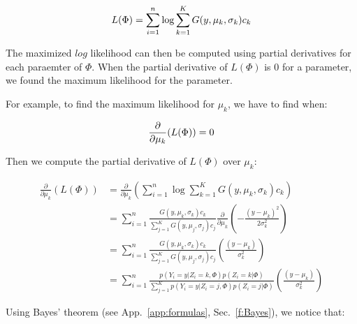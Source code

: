   \begin{equation*}\label{LP}
  L(\Phi)=\sum_{i=1}^n \operatorname*{log} \sum_{k=1}^K G(y,\mu_k,\sigma_k)c_k\\
  \end{equation*}

The maximized $log$ likelihood can then be computed using partial derivatives for each paraemter of $\Phi$. When the partial derivative of $L(\Phi)$ is $0$ for a parameter, we found the maximum likelihood for the parameter.
\par
For example, to find the maximum likelihood for $\mu_k$, we have to find when:

  \begin{equation*}\label{PD}
  \frac{\partial}{\partial\mu_k}(L(\Phi))=0\\
  \end{equation*}

\par
Then we compute the partial derivative of $L(\Phi)$ over $\mu_k$:

  \begin{align}\label{partialDerivative}
  \frac{\partial}{\partial\mu_k}(L(\Phi)) &= \frac{\partial}{\partial\mu_k}( \sum_{i=1}^n \operatorname*{log} \sum_{k=1}^K G(y,\mu_k,\sigma_k)c_k\nonumber)  \\
                                          &= \sum_{i=1}^n \frac{G(y,\mu_k,\sigma_k)c_k}{\sum_{j=1}^K G(y,\mu_j,\sigma_j)c_j}\frac{\partial}{\partial\mu_k}  (-\frac{(y-\mu_k)^2}{2\sigma_k^2}) \nonumber \\
                                          &= \sum_{i=1}^n \frac{G(y,\mu_k,\sigma_k)c_k}{\sum_{j=1}^K G(y,\mu_j,\sigma_j)c_j}(\frac{(y-\mu_k)}{\sigma_k^2}) \nonumber \\
                                          &= \sum_{i=1}^n \frac{p(Y_i=y|Z_i=k,\Phi)p(Z_i=k|\Phi)}{\sum_{j=1}^K p(Y_i=y|Z_i=j,\Phi)p(Z_i=j|\Phi)}(\frac{(y-\mu_k)} {\sigma_k^2})
  \end{align}

Using Bayes' theorem (see App.~\ref{app:formulas}, Sec.~\ref{f:Bayes}), we notice that:

